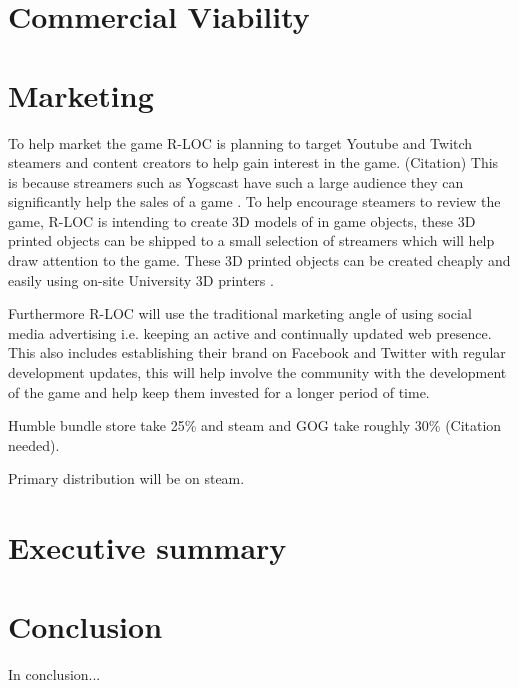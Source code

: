 \documentclass{scrartcl}
\begin{document}
\section{Commercial Viability}


\section{Marketing}
To help market the game R-LOC is planning to target Youtube and Twitch steamers and content creators to help gain interest in the game. (Citation)
This is because streamers such as Yogscast have such a large audience they can significantly help the sales of a game \cite{Hoggins, Rose}.  To help encourage steamers to review the game, R-LOC is intending to create 3D models of in game objects, these 3D printed objects can be shipped to a small selection of streamers which will help draw attention to the game. These 3D printed objects can be created cheaply and easily using on-site University 3D printers \cite{Rose}.

Furthermore R-LOC will use the traditional marketing angle of using social media advertising i.e. keeping an active and continually updated web presence. 
This also includes establishing their brand on Facebook and Twitter with regular development updates, this will help involve the community with the development of the game and help keep them invested for a longer period of time.

Humble bundle store take 25\% \cite{HumblebundleFAQ} and steam and GOG take roughly 30\% (Citation needed).

Primary distribution will be on steam.


\section{Executive summary}


\section{Conclusion}
In conclusion...






\end{document}
